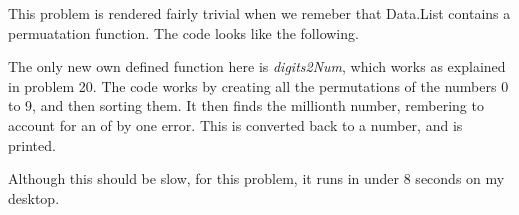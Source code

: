 This problem is rendered fairly trivial when we remeber that Data.List contains a permuatation function. The code looks like the following.



The only new own defined function here is \textit{digits2Num}, which works as explained in problem 20. The code works by creating all the permutations of the numbers 0 to 9, and then sorting them. It then finds the millionth number, rembering to account for an of by one error. This is converted back to a number, and is printed.

Although this should be slow, for this problem, it runs in under 8 seconds on my desktop.
